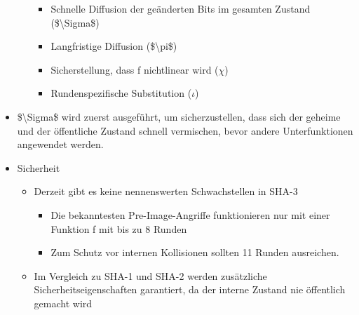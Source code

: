 \documentclass[a4paper]{article}
\begin{document}
\begin{multicols}{3}
\begin{itemize}
\begin{itemize}
                        \begin{itemize}
                            \item
                                  Schnelle Diffusion der geänderten Bits im gesamten Zustand
                                  (\$\textbackslash Sigma\$)
                            \item
                                  Langfristige Diffusion (\$\textbackslash pi\$)
                            \item
                                  Sicherstellung, dass f nichtlinear wird ($\chi$)
                            \item
                                  Rundenspezifische Substitution ($\iota$)
                        \end{itemize}
              \end{itemize}
        \item
              \$\textbackslash Sigma\$ wird zuerst ausgeführt, um sicherzustellen,
              dass sich der geheime und der öffentliche Zustand schnell vermischen,
              bevor andere Unterfunktionen angewendet werden.
        \item
              Sicherheit

              \begin{itemize}
                  \item
                        Derzeit gibt es keine nennenswerten Schwachstellen in SHA-3

                        \begin{itemize}
                            \item
                                  Die bekanntesten Pre-Image-Angriffe funktionieren nur mit einer
                                  Funktion f mit bis zu 8 Runden
                            \item
                                  Zum Schutz vor internen Kollisionen sollten 11 Runden ausreichen.
                        \end{itemize}
                  \item
                        Im Vergleich zu SHA-1 und SHA-2 werden zusätzliche
                        Sicherheitseigenschaften garantiert, da der interne Zustand nie
                        öffentlich gemacht wird


\end{itemize}
\end{itemize}
\end{multicols}
\end{document}
